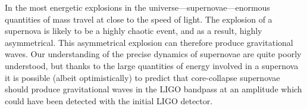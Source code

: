 In the most energetic explosions in the
universe---supernovae---enormous quantities of mass travel at close to
the speed of light. The explosion of a supernova is likely to be a
highly chaotic event, and as a result, highly asymmetrical. This
asymmetrical explosion can therefore produce gravitational waves. Our
understanding of the precise dynamics of supernovae are quite poorly
understood, but thanks to the large quantities of energy involved in a
supernova it is possible (albeit optimistically) to predict that
core-collapse supernovae should produce gravitational waves in the
LIGO bandpass at an amplitude which could have been detected with the
initial LIGO detector\cite{2009LRR....12....2S}.

